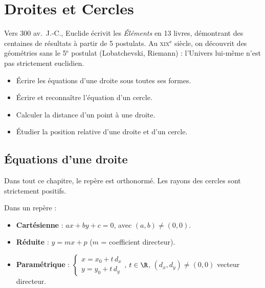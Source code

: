 \chapter{Droites et Cercles}


\begin{anecdote}
Vers $300$ av.\ J.-C., Euclide \'ecrivit les \textit{\'El\'ements} en 13 livres,
d\'emontrant des centaines de r\'esultats \`a partir de 5 postulats. Au
\textsc{xix}$^{\text{e}}$ si\`ecle, on d\'ecouvrit des g\'eom\'etries sans le
5$^{\text{e}}$ postulat (Lobatchevski, Riemann) : l'Univers lui-m\^{e}me
n'est pas strictement euclidien.
\end{anecdote}

\begin{objectifs}
\begin{itemize}
  \item \'Ecrire les \'equations d'une droite sous toutes ses formes.
  \item \'Ecrire et reconna\^itre l'\'equation d'un cercle.
  \item Calculer la distance d'un point \`a une droite.
  \item \'Etudier la position relative d'une droite et d'un cercle.
\end{itemize}
\end{objectifs}

\section{\'Equations d'une droite}
Dans tout ce chapitre, le rep\`ere est orthonorm\'e.
Les rayons des cercles sont strictement positifs.

\begin{defn}
Dans un rep\`ere :
\begin{itemize}
  \item \textbf{Cart\'esienne} : $ax + by + c = 0$, avec $(a,b)\ne(0,0)$.
  \item \textbf{R\'eduite} : $y = mx + p$ ($m$ = coefficient directeur).
  \item \textbf{Param\'etrique} :
        $\begin{cases}x = x_0 + t\,d_x\\ y = y_0 + t\,d_y\end{cases}$,
        $t\in\R$, $(d_x,d_y)\ne(0,0)$ vecteur directeur.
\end{itemize}
\end{defn}

